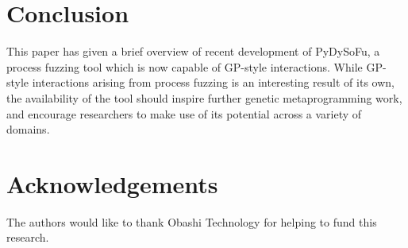 \documentclass[draft,12pt]{llncs} %
\begin{document}
\section{Conclusion}
This paper has given a brief overview of recent development of PyDySoFu, a
process fuzzing tool which is now capable of GP-style interactions. While
GP-style interactions arising from process fuzzing is an interesting result of
its own, the availability of the tool should inspire further genetic
metaprogramming work, and encourage researchers to make use of its
potential across a variety of domains.\par

\section*{Acknowledgements}
\label{sec:ack}
The authors would like to thank Obashi Technology for helping to fund this research.



\end{document}
